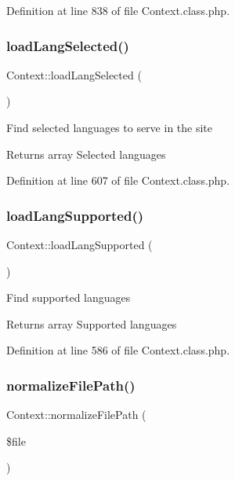 Definition at line 838 of file Context.\+class.\+php.

\hypertarget{classContext_afe4b34f1e0286152e17981fd1da3a560}{}\label{classContext_afe4b34f1e0286152e17981fd1da3a560} 
\subsubsection{\texorpdfstring{load\+Lang\+Selected()}{loadLangSelected()}}
{\footnotesize\ttfamily Context\+::load\+Lang\+Selected (\begin{DoxyParamCaption}{ }\end{DoxyParamCaption})}

Find selected languages to serve in the site

\begin{DoxyReturn}{Returns}
array Selected languages 
\end{DoxyReturn}


Definition at line 607 of file Context.\+class.\+php.

\hypertarget{classContext_aec949117f584972aa60416e60f460c8b}{}\label{classContext_aec949117f584972aa60416e60f460c8b} 
\subsubsection{\texorpdfstring{load\+Lang\+Supported()}{loadLangSupported()}}
{\footnotesize\ttfamily Context\+::load\+Lang\+Supported (\begin{DoxyParamCaption}{ }\end{DoxyParamCaption})}

Find supported languages

\begin{DoxyReturn}{Returns}
array Supported languages 
\end{DoxyReturn}


Definition at line 586 of file Context.\+class.\+php.

\hypertarget{classContext_a47a8a7878385f0d5cb7085f933157128}{}\label{classContext_a47a8a7878385f0d5cb7085f933157128} 
\subsubsection{\texorpdfstring{normalize\+File\+Path()}{normalizeFilePath()}}
{\footnotesize\ttfamily Context\+::normalize\+File\+Path (\begin{DoxyParamCaption}\item[{}]{\$file }\end{DoxyParamCaption})}

